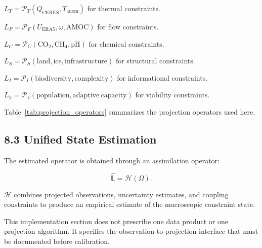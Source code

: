 \(L_T=\mathcal{P}_T(Q_{\mathrm{CERES}},T_{\mathrm{anom}})\) for thermal constraints.

\(L_F=\mathcal{P}_F(U_{\mathrm{ERA5}},\omega,\mathrm{AMOC})\) for flow constraints.

\(L_C=\mathcal{P}_C(\mathrm{CO}_2,\mathrm{CH}_4,\mathrm{pH})\) for chemical constraints.

\(L_S=\mathcal{P}_S(\mathrm{land},\mathrm{ice},\mathrm{infrastructure})\) for structural constraints.

\(L_I=\mathcal{P}_I(\mathrm{biodiversity},\mathrm{complexity})\) for informational constraints.

\(L_V=\mathcal{P}_V(\mathrm{population},\mathrm{adaptive\ capacity})\) for viability constraints.

Table~\ref{tab:projection_operators} summarizes the projection operators used here.



\subsection{8.3 Unified State Estimation}

The estimated operator is obtained through an assimilation operator:

\[ \hat{\mathbb{L}}=\mathcal{H}(\Omega). \]

\(\mathcal{H}\) combines projected observations, uncertainty estimates, and coupling constraints to produce an empirical estimate of the macroscopic constraint state.

This implementation section does not prescribe one data product or one projection algorithm. It specifies the observation-to-projection interface that must be documented before calibration.


